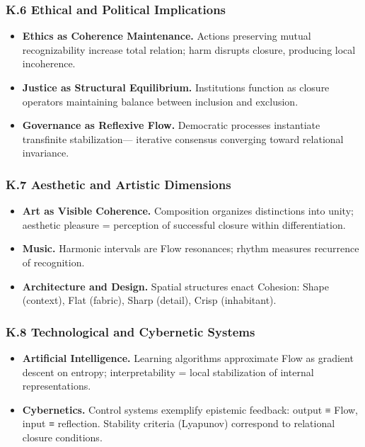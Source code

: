 \documentclass[11pt]{article}
\begin{document}
\subsubsection*{K.6 Ethical and Political Implications}
\label{sec:org170aa8d}
\begin{itemize}
\item \textbf{\textbf{Ethics as Coherence Maintenance.}}  Actions preserving mutual recognizability increase total relation;  
harm disrupts closure, producing local incoherence.
\item \textbf{\textbf{Justice as Structural Equilibrium.}}  Institutions function as closure operators maintaining balance between inclusion and exclusion.
\item \textbf{\textbf{Governance as Reflexive Flow.}}  Democratic processes instantiate transfinite stabilization—  
iterative consensus converging toward relational invariance.
\end{itemize}
\subsubsection*{K.7 Aesthetic and Artistic Dimensions}
\label{sec:org2c1197e}
\begin{itemize}
\item \textbf{\textbf{Art as Visible Coherence.}}  Composition organizes distinctions into unity;  
aesthetic pleasure = perception of successful closure within differentiation.
\item \textbf{\textbf{Music.}}  Harmonic intervals are Flow resonances; rhythm measures recurrence of recognition.
\item \textbf{\textbf{Architecture and Design.}}  Spatial structures enact Cohesion: Shape (context), Flat (fabric), Sharp (detail), Crisp (inhabitant).
\end{itemize}
\subsubsection*{K.8 Technological and Cybernetic Systems}
\label{sec:org841c54e}
\begin{itemize}
\item \textbf{\textbf{Artificial Intelligence.}}  Learning algorithms approximate Flow as gradient descent on entropy;  
interpretability = local stabilization of internal representations.
\item \textbf{\textbf{Cybernetics.}}  Control systems exemplify epistemic feedback: output ≡ Flow, input ≡ reflection.  
Stability criteria (Lyapunov) correspond to relational closure conditions.
\end{itemize}
\end{document}
